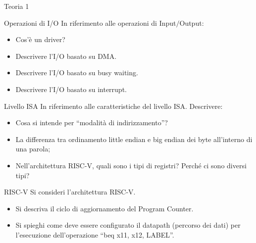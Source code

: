 \begin{quiz}{Teoria 1}
\begin{essay}[points=7]{Operazioni di I/O}
In riferimento alle operazioni di Input$/$Output:
\begin{itemize}
\item Cos'è un driver?
\item Descrivere l'I/O basato su DMA.
\item Descrivere l'I/O basato su busy waiting.
\item Descrivere l'I/O basato su interrupt.
\end{itemize}
\end{essay}

\begin{essay}[points=7]{Livello ISA}
In riferimento alle caratteristiche del livello ISA. Descrivere:
\begin{itemize}
\item Cosa si intende per ``modalità di indirizzamento''?
\item La differenza tra ordinamento little endian e big endian dei byte all'interno di una parola;
\item Nell'architettura RISC-V, quali sono i tipi di registri? Perché ci sono diversi tipi?
\end{itemize}
\end{essay}

\begin{essay}[points=7]{RISC-V}
Si consideri l'architettura RISC-V.

\begin{itemize}
\item Si descriva il ciclo di aggiornamento del Program Counter.
\item Si spieghi come deve essere configurato il datapath (percorso dei dati) per l'esecuzione dell'operazione ``beq x11, x12, LABEL''.
\end{itemize}
\end{essay}

\end{quiz}




